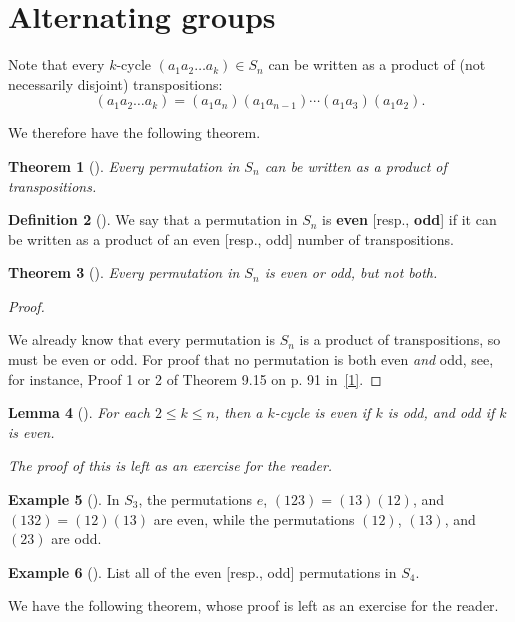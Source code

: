 \documentclass[10pt,]{book}
\newcommand{\terminology}[1]{\textbf{#1}}
\theoremstyle{plain}
\newtheorem{theorem}{Theorem}[section]
\newtheorem{lemma}[theorem]{Lemma}
\theoremstyle{definition}
\newtheorem{definition}[theorem]{Definition}
\theoremstyle{definition}
\theoremstyle{definition}
\newtheorem{example}[theorem]{Example}
\theoremstyle{definition}
\numberwithin{equation}{section}
\begin{document}
\section[{Alternating groups}]{Alternating groups}\label{section-19}
Note that every \(k\)-cycle \((a_1a_2\ldots a_k)\in S_n\) can be written as a product of (not necessarily disjoint) transpositions:%
\begin{equation*}
(a_1a_2\ldots a_k)=(a_1a_n)(a_1a_{n-1})\cdots(a_1a_3)(a_1a_2).
\end{equation*}
%
\par
We therefore have the following theorem.%
\begin{theorem}[{}]\label{theorem-34}
Every permutation in \(S_n\) can be written as a product of transpositions.%
\end{theorem}
\begin{definition}[{}]\label{definition-49}
We say that a permutation in \(S_n\) is \terminology{even} [resp., \terminology{odd}] if it can be written as a product of an even [resp., odd] number of transpositions.%
\end{definition}
\begin{theorem}[{}]\label{theorem-35}
Every permutation in \(S_n\) is even or odd, but not both.%
\end{theorem}
\begin{proof}\hypertarget{proof-28}{}
We already know that every permutation is \(S_n\) is a product of transpositions, so must be even or odd. For proof that no permutation is both even \emph{and} odd, see, for instance, Proof 1 or 2 of Theorem 9.15 on p. 91 in~\hyperlink{F}{[1]}.%
\end{proof}
\begin{lemma}[{}]\label{evenodd}
For each \(2\leq k\leq n\), then a \(k\)-cycle is even if \(k\) is odd, and odd if \(k\) is even.%
\par
The proof of this is left as an exercise for the reader.%
\end{lemma}
\begin{example}[]\label{example-58}
In \(S_3\), the permutations \(e\), \((123)=(13)(12)\), and \((132)=(12)(13)\) are even, while the permutations \((12)\), \((13)\), and \((23)\) are odd.%
\end{example}
\begin{example}[]\label{example-59}
List all of the even [resp., odd] permutations in \(S_4\).%
\end{example}
We have the following theorem, whose proof is left as an exercise for the reader.%
\end{document}
